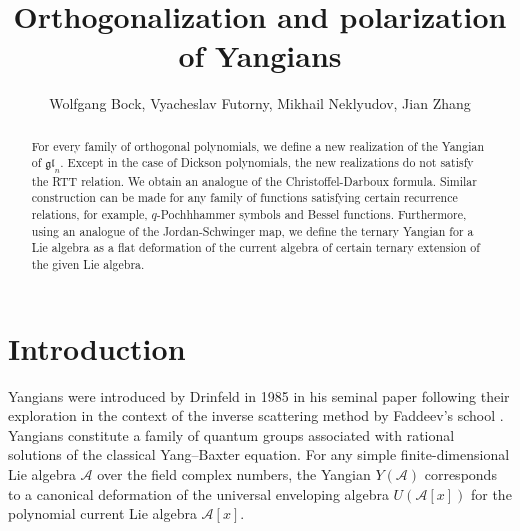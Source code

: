 \documentclass[10pt]{article}%
\title{Orthogonalization and polarization of Yangians
}
\author{Wolfgang Bock, Vyacheslav Futorny, Mikhail Neklyudov, Jian Zhang}
\date{}
\numberwithin{equation}{section}
\newcommand{\gl}{{\mathfrak{gl}}}
\begin{document}
\maketitle

\begin{abstract}
For every family of orthogonal
polynomials,  we define a new realization of the Yangian of $\gl_n$. Except in the case of Dickson polynomials, the new realizations do not satisfy the RTT relation. We obtain an analogue of the Christoffel-Darboux  formula. Similar construction can be made for any family of functions satisfying certain recurrence relations, for example, $q$-Pochhhammer symbols and Bessel functions. Furthermore, using an analogue of the Jordan-Schwinger map, we define the ternary Yangian for a Lie algebra as a flat deformation of the current algebra of certain ternary extension of the given Lie algebra.



\end{abstract}

\section{Introduction}

Yangians were introduced by Drinfeld in 1985 in his seminal paper \cite{D}   following their exploration in the context of the inverse scattering method by Faddeev's  school \cite{STF,TTF}. Yangians constitute a family of quantum groups associated with rational solutions of the classical Yang–Baxter equation. For any simple finite-dimensional Lie algebra $\mathcal A$ over the field complex numbers, the Yangian $Y(\mathcal A)$ corresponds to a canonical deformation of the universal enveloping algebra $U(\mathcal A[x])$ for the polynomial current Lie algebra $\mathcal A[x]$. 

 





\end{document}
